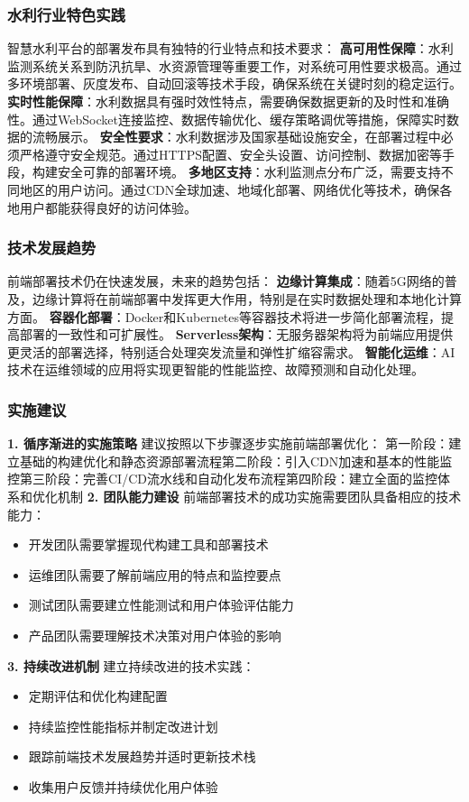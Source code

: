 \subsubsection{水利行业特色实践}\label{ux6c34ux5229ux884cux4e1aux7279ux8272ux5b9eux8df5} 智慧水利平台的部署发布具有独特的行业特点和技术要求：
\textbf{高可用性保障}：水利监测系统关系到防汛抗旱、水资源管理等重要工作，对系统可用性要求极高。通过多环境部署、灰度发布、自动回滚等技术手段，确保系统在关键时刻的稳定运行。
\textbf{实时性能保障}：水利数据具有强时效性特点，需要确保数据更新的及时性和准确性。通过WebSocket连接监控、数据传输优化、缓存策略调优等措施，保障实时数据的流畅展示。
\textbf{安全性要求}：水利数据涉及国家基础设施安全，在部署过程中必须严格遵守安全规范。通过HTTPS配置、安全头设置、访问控制、数据加密等手段，构建安全可靠的部署环境。
\textbf{多地区支持}：水利监测点分布广泛，需要支持不同地区的用户访问。通过CDN全球加速、地域化部署、网络优化等技术，确保各地用户都能获得良好的访问体验。
\subsubsection{技术发展趋势}\label{ux6280ux672fux53d1ux5c55ux8d8bux52bf} 前端部署技术仍在快速发展，未来的趋势包括：
\textbf{边缘计算集成}：随着5G网络的普及，边缘计算将在前端部署中发挥更大作用，特别是在实时数据处理和本地化计算方面。
\textbf{容器化部署}：Docker和Kubernetes等容器技术将进一步简化部署流程，提高部署的一致性和可扩展性。
\textbf{Serverless架构}：无服务器架构将为前端应用提供更灵活的部署选择，特别适合处理突发流量和弹性扩缩容需求。 \textbf{智能化运维}：AI技术在运维领域的应用将实现更智能的性能监控、故障预测和自动化处理。
\subsubsection{实施建议}\label{ux5b9eux65bdux5efaux8bae} \textbf{1. 循序渐进的实施策略} 建议按照以下步骤逐步实施前端部署优化：
第一阶段：建立基础的构建优化和静态资源部署流程第二阶段：引入CDN加速和基本的性能监控第三阶段：完善CI/CD流水线和自动化发布流程第四阶段：建立全面的监控体系和优化机制 \textbf{2. 团队能力建设}
前端部署技术的成功实施需要团队具备相应的技术能力： \begin{itemize} \tightlist \item 开发团队需要掌握现代构建工具和部署技术 \item 运维团队需要了解前端应用的特点和监控要点 \item
测试团队需要建立性能测试和用户体验评估能力 \item 产品团队需要理解技术决策对用户体验的影响 \end{itemize} \textbf{3. 持续改进机制} 建立持续改进的技术实践： \begin{itemize}
\tightlist \item 定期评估和优化构建配置 \item 持续监控性能指标并制定改进计划 \item 跟踪前端技术发展趋势并适时更新技术栈 \item 收集用户反馈并持续优化用户体验 \end{itemize}

